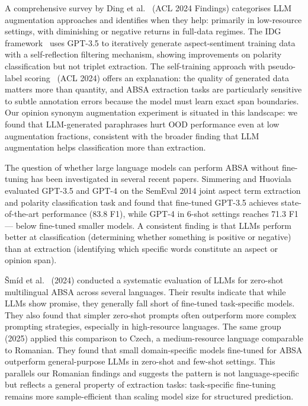 \documentclass[12pt,a4paper]{report}
\begin{document}
A comprehensive survey by Ding et al.~\cite{ding2024llm_aug_survey} (ACL 2024 Findings) categorises LLM augmentation approaches and identifies when they help: primarily in low-resource settings, with diminishing or negative returns in full-data regimes. The IDG framework~\cite{zhong2024iterative} uses GPT-3.5 to iteratively generate aspect-sentiment training data with a self-reflection filtering mechanism, showing improvements on polarity classification but not triplet extraction. The self-training approach with pseudo-label scoring~\cite{st_scorer2024} (ACL 2024) offers an explanation: the quality of generated data matters more than quantity, and ABSA extraction tasks are particularly sensitive to subtle annotation errors because the model must learn exact span boundaries. Our opinion synonym augmentation experiment is situated in this landscape: we found that LLM-generated paraphrases hurt OOD performance even at low augmentation fractions, consistent with the broader finding that LLM augmentation helps classification more than extraction.

The question of whether large language models can perform ABSA without fine-tuning has been investigated in several recent papers. Simmering and Huoviala~\cite{veyseh2024llm_absa} evaluated GPT-3.5 and GPT-4 on the SemEval 2014 joint aspect term extraction and polarity classification task and found that fine-tuned GPT-3.5 achieves state-of-the-art performance (83.8 F1), while GPT-4 in 6-shot settings reaches 71.3 F1 --- below fine-tuned smaller models. A consistent finding is that LLMs perform better at classification (determining whether something is positive or negative) than at extraction (identifying which specific words constitute an aspect or opinion span).

\v{S}m\'{i}d et al.~\cite{smid2024multilingual_llm_absa} (2024) conducted a systematic evaluation of LLMs for zero-shot multilingual ABSA across several languages. Their results indicate that while LLMs show promise, they generally fall short of fine-tuned task-specific models. They also found that simpler zero-shot prompts often outperform more complex prompting strategies, especially in high-resource languages. The same group~\cite{smid2025czech_absa} (2025) applied this comparison to Czech, a medium-resource language comparable to Romanian. They found that small domain-specific models fine-tuned for ABSA outperform general-purpose LLMs in zero-shot and few-shot settings. This parallels our Romanian findings and suggests the pattern is not language-specific but reflects a general property of extraction tasks: task-specific fine-tuning remains more sample-efficient than scaling model size for structured prediction.
\end{document}
